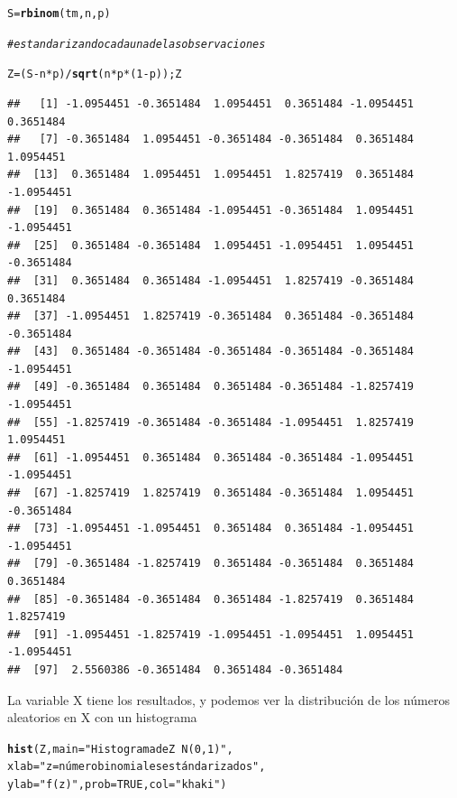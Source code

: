 \documentclass[12pt,letterpaper]{article}\usepackage[]{graphicx}\usepackage[]{color}
\makeatletter
\newcommand{\hlnum}[1]{\textcolor[rgb]{0.686,0.059,0.569}{#1}}%
\newcommand{\hlstr}[1]{\textcolor[rgb]{0.192,0.494,0.8}{#1}}%
\newcommand{\hlcom}[1]{\textcolor[rgb]{0.678,0.584,0.686}{\textit{#1}}}%
\newcommand{\hlopt}[1]{\textcolor[rgb]{0,0,0}{#1}}%
\newcommand{\hlstd}[1]{\textcolor[rgb]{0.345,0.345,0.345}{#1}}%
\newcommand{\hlkwb}[1]{\textcolor[rgb]{0.69,0.353,0.396}{#1}}%
\newcommand{\hlkwc}[1]{\textcolor[rgb]{0.333,0.667,0.333}{#1}}%
\newcommand{\hlkwd}[1]{\textcolor[rgb]{0.737,0.353,0.396}{\textbf{#1}}}%
\newenvironment{kframe}{%
 \def\at@end@of@kframe{}%
 \ifinner\ifhmode%
  \def\at@end@of@kframe{\end{minipage}}%
  \begin{minipage}{\columnwidth}%
 \fi\fi%
 \def\FrameCommand##1{\hskip\@totalleftmargin \hskip-\fboxsep
 \colorbox{shadecolor}{##1}\hskip-\fboxsep
     \hskip-\linewidth \hskip-\@totalleftmargin \hskip\columnwidth}%
 \MakeFramed {\advance\hsize-\width
   \@totalleftmargin\z@ \linewidth\hsize
   \@setminipage}}%
 {\par\unskip\endMakeFramed%
 \at@end@of@kframe}
\newenvironment{knitrout}{}{} %
\makeatother
\begin{document}
\begin{enumerate}
\begin{knitrout}
\begin{kframe}
\begin{alltt}
\hlstd{S} \hlkwb{=} \hlkwd{rbinom}\hlstd{(tm, n, p)}

\hlcom{# estandarizando cada una de las observaciones}

\hlstd{Z} \hlkwb{=} \hlstd{(S}\hlopt{-}\hlstd{n}\hlopt{*}\hlstd{p)}\hlopt{/}\hlkwd{sqrt}\hlstd{(n}\hlopt{*}\hlstd{p}\hlopt{*}\hlstd{(}\hlnum{1}\hlopt{-}\hlstd{p)); Z}
\end{alltt}
\begin{verbatim}
##   [1] -1.0954451 -0.3651484  1.0954451  0.3651484 -1.0954451  0.3651484
##   [7] -0.3651484  1.0954451 -0.3651484 -0.3651484  0.3651484  1.0954451
##  [13]  0.3651484  1.0954451  1.0954451  1.8257419  0.3651484 -1.0954451
##  [19]  0.3651484  0.3651484 -1.0954451 -0.3651484  1.0954451 -1.0954451
##  [25]  0.3651484 -0.3651484  1.0954451 -1.0954451  1.0954451 -0.3651484
##  [31]  0.3651484  0.3651484 -1.0954451  1.8257419 -0.3651484  0.3651484
##  [37] -1.0954451  1.8257419 -0.3651484  0.3651484 -0.3651484 -0.3651484
##  [43]  0.3651484 -0.3651484 -0.3651484 -0.3651484 -0.3651484 -1.0954451
##  [49] -0.3651484  0.3651484  0.3651484 -0.3651484 -1.8257419 -1.0954451
##  [55] -1.8257419 -0.3651484 -0.3651484 -1.0954451  1.8257419  1.0954451
##  [61] -1.0954451  0.3651484  0.3651484 -0.3651484 -1.0954451 -1.0954451
##  [67] -1.8257419  1.8257419  0.3651484 -0.3651484  1.0954451 -0.3651484
##  [73] -1.0954451 -1.0954451  0.3651484  0.3651484 -1.0954451 -1.0954451
##  [79] -0.3651484 -1.8257419  0.3651484 -0.3651484  0.3651484  0.3651484
##  [85] -0.3651484 -0.3651484  0.3651484 -1.8257419  0.3651484  1.8257419
##  [91] -1.0954451 -1.8257419 -1.0954451 -1.0954451  1.0954451 -1.0954451
##  [97]  2.5560386 -0.3651484  0.3651484 -0.3651484
\end{verbatim}
\end{kframe}
\end{knitrout}

La variable X tiene los resultados, y podemos ver la distribuci\'on de los n\'umeros aleatorios en X con un histograma
\begin{knitrout}
\color{fgcolor}\begin{kframe}
\begin{alltt}
\hlkwd{hist}\hlstd{(Z,} \hlkwc{main}\hlstd{=}\hlstr{"Histograma de Z ~ N(0, 1)"}\hlstd{,}
     \hlkwc{xlab}\hlstd{=}\hlstr{"z = número binomiales estándarizados"}\hlstd{,}
\hlkwc{ylab}\hlstd{=}\hlstr{"f(z)"}\hlstd{,} \hlkwc{prob}\hlstd{=}\hlnum{TRUE}\hlstd{,} \hlkwc{col}\hlstd{=}\hlstr{"khaki"}\hlstd{)}


\end{alltt}
\end{kframe}
\end{knitrout}
\end{enumerate}
\end{document}
